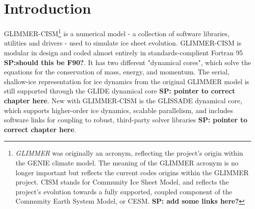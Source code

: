 
\section{Introduction}
%
GLIMMER-CISM\footnote{{\it GLIMMER} was originally an acronym, reflecting the project's origin within the GENIE climate model. The meaning of the GLIMMER acronym is no longer important but reflects the current codes origins within the GLIMMER project. CISM stands for Community Ice Sheet Model, and reflects the project's evolution towards a fully supported, coupled component of the Community Earth System Model, or CESM. {\bf SP: add some links here?}} is a numerical model - a collection of software libraries, utilities and drivers  - used to simulate ice sheet evolution. GLIMMER-CISM is modular in design and coded almost entirely in standards-complient Fortran 95 \textbf{SP:should this be F90?}. It has two different "dynamical cores", which solve the equations for the conservation of mass, energy, and momentum. The serial, shallow-ice representation for ice dynamics from the original GLIMMER model is still supported through the GLIDE dynamical core \textbf{SP: pointer to correct chapter here}. New with GLIMMER-CISM is the GLISSADE dynamical core, which supports higher-order ice dynamics, scalable parallelism, and includes software links for coupling to robust, third-party solver libraries \textbf{SP: pointer to correct chapter here}. 
%
